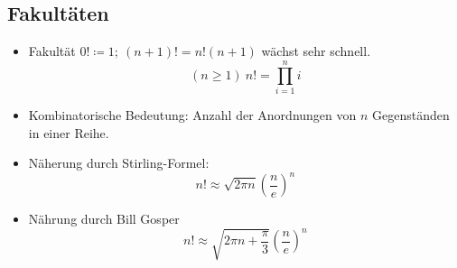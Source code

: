 \subsection{Fakultäten}
\begin{itemize}
    \item Fakultät $0! \coloneqq 1;\ (n+1)!=n!(n+1)$ wächst sehr schnell.
    $$(n \geq 1)\ n! = \prod\limits_{i=1}^n i$$
    \item Kombinatorische Bedeutung: Anzahl der Anordnungen von $n$ Gegenständen in einer Reihe.
    \item Näherung durch Stirling-Formel:
    $$n! \approx \sqrt{2 \pi n} \left(\frac{n}{e}\right)^n$$
    \item Nährung durch Bill Gosper
    $$n! \approx \sqrt{2 \pi n + \frac{\pi}{3}}\left(\frac{n}{e}\right)^n$$
\end{itemize}
